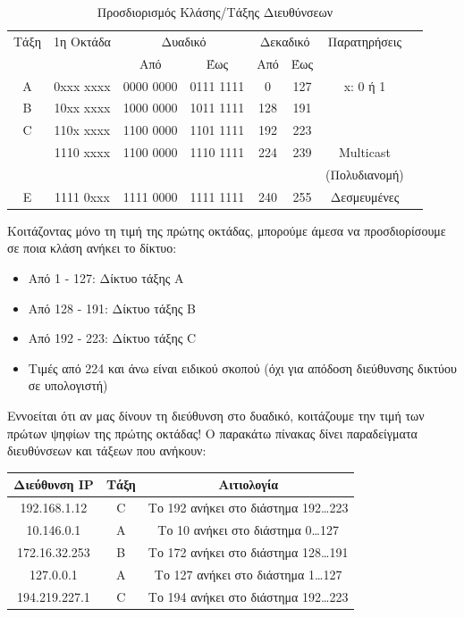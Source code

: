 \begin{table}
\centering
  \begin{tabular}{|c|c|c|c|c|c|c|c|}
    \rowcolor[gray]{0.95}
    \hline
    \multirow{2}{*}{} Τάξη & 1η Οκτάδα & \multicolumn{2}{|c|}{Δυαδικό} & \multicolumn{2}{|c|}{Δεκαδικό} & Παρατηρήσεις \\ 
    \cline{3-6}
     \rowcolor[gray]{0.95}
    & & Από & Έως & Από & Έως & \\
    \hline
    A & 0xxx xxxx & 0000 0000 & 0111 1111 & 0 & 127 & x: 0 ή 1\\
    \hline
    Β & 10xx xxxx & 1000 0000 & 1011 1111 & 128 & 191 & \\
    \hline
    C & 110x xxxx & 1100 0000 & 1101 1111 & 192 & 223 & \\
    \hline
    \multirow{2}{*}{}D & 1110 xxxx & 1100 0000 & 1110 1111 & 224 & 239 & Multicast  \\
    & & & & & & (Πολυδιανομή) \\
    \hline
    E & 1111 0xxx & 1111 0000 & 1111 1111 & 240 & 255 & Δεσμευμένες\\
    \hline 
  \end{tabular}
  
\caption{Προσδιορισμός Κλάσης/Τάξης Διευθύνσεων}
\label{t3-1-2}
\end{table}

Κοιτάζοντας μόνο τη τιμή της πρώτης οκτάδας, μπορούμε άμεσα να προσδιορίσουμε σε ποια κλάση ανήκει το δίκτυο:

\begin{itemize}
\item Από 1 - 127: Δίκτυο τάξης Α
\item Από 128 - 191: Δίκτυο τάξης B
\item Από 192 - 223: Δίκτυο τάξης C
\item Τιμές από 224 και άνω είναι ειδικού σκοπού (όχι για απόδοση διεύθυνσης δικτύου σε υπολογιστή)
\end{itemize}

Εννοείται ότι αν μας δίνουν τη διεύθυνση στο δυαδικό, κοιτάζουμε την τιμή των πρώτων ψηφίων της πρώτης οκτάδας!
Ο παρακάτω πίνακας δίνει παραδείγματα διευθύνσεων και τάξεων που ανήκουν:

\begin{center}
\begin{tabular}{|c|c|c|}
\hline
\rowcolor[gray]{0.95}
Διεύθυνση IP & Τάξη & Αιτιολογία \\
\hline
192.168.1.12 & C & Το 192 ανήκει στο διάστημα 192\ldots223\\
\hline
10.146.0.1 & A & Το 10 ανήκει στο διάστημα 0\ldots127\\
\hline
172.16.32.253 & B & Το 172 ανήκει στο διάστημα 128\ldots191\\
\hline
127.0.0.1 & A & Το 127 ανήκει στο διάστημα 1\ldots127\\
\hline
194.219.227.1 & C & Το 194 ανήκει στο διάστημα 192\ldots223\\
\hline
\end{tabular}
\end{center}

